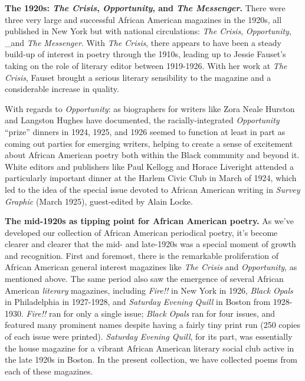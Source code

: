 \documentclass[
  letterpaper,
  DIV=11,
  numbers=noendperiod]{scrartcl}
\begin{document}
\textbf{The 1920s: \emph{The Crisis}, \emph{Opportunity}, and \emph{The
Messenger}. } There were three very large and successful African
American magazines in the 1920s, all published in New York but with
national circulations: \emph{The Crisis}, \emph{Opportunity}, \_and
\emph{The Messenger}. With \emph{The Crisis}, there appears to have been
a steady build-up of interest in poetry through the 1910s, leading up to
Jessie Fauset's taking on the role of literary editor between 1919-1926.
With her work at \emph{The Crisis}, Fauset brought a serious literary
sensibility to the magazine and a considerable increase in quality.

With regards to \emph{Opportunity}: as biographers for writers like Zora
Neale Hurston and Langston Hughes have documented, the
racially-integrated \emph{Opportunity }``prize'' dinners in 1924, 1925,
and 1926 seemed to function at least in part as coming out parties for
emerging writers, helping to create a sense of excitement about African
American poetry both within the Black community and beyond it. White
editors and publishers like Paul Kellogg and Horace Liveright attended a
particularly important dinner at the Harlem Civic Club in March of 1924,
which led to the idea of the special issue devoted to African American
writing in \emph{Survey Graphic }(March 1925), guest-edited by Alain
Locke.

\textbf{The mid-1920s as tipping point for African American poetry.} As
we've developed our collection of African American periodical poetry,
it's become clearer and clearer that the mid- and late-1920s was a
special moment of growth and recognition. First and foremost, there is
the remarkable proliferation of African American general interest
magazines like \emph{The Crisis} and \emph{Opportunity}, as mentioned
above. The same period also saw the emergence of several African
American \emph{literary} magazines, including \emph{Fire!!} in New York
in 1926, \emph{Black Opals} in Philadelphia in 1927-1928, and
\emph{Saturday Evening Quill} in Boston from 1928-1930. \emph{Fire!!}
ran for only a single issue; \emph{Black Opals} ran for four issues, and
featured many prominent names despite having a fairly tiny print run
(250 copies of each issue were printed). \emph{Saturday Evening Quill},
for its part, was essentially the house magazine for a vibrant African
American literary social club active in the late 1920s in Boston. In the
present collection, we have collected poems from each of these
magazines.
\end{document}
